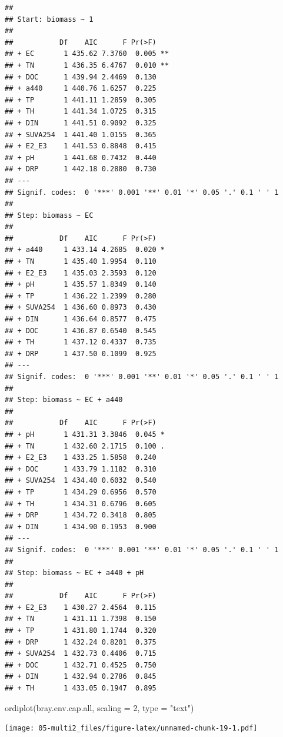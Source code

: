 \documentclass[
]{book}
\newenvironment{Shaded}{\begin{snugshade}}{\end{snugshade}}
\newcommand{\AttributeTok}[1]{\textcolor[rgb]{0.77,0.63,0.00}{#1}}
\newcommand{\DecValTok}[1]{\textcolor[rgb]{0.00,0.00,0.81}{#1}}
\newcommand{\FunctionTok}[1]{\textcolor[rgb]{0.00,0.00,0.00}{#1}}
\newcommand{\NormalTok}[1]{#1}
\newcommand{\StringTok}[1]{\textcolor[rgb]{0.31,0.60,0.02}{#1}}
\begin{document}
\begin{verbatim}
## 
## Start: biomass ~ 1 
## 
##           Df    AIC      F Pr(>F)   
## + EC       1 435.62 7.3760  0.005 **
## + TN       1 436.35 6.4767  0.010 **
## + DOC      1 439.94 2.4469  0.130   
## + a440     1 440.76 1.6257  0.225   
## + TP       1 441.11 1.2859  0.305   
## + TH       1 441.34 1.0725  0.315   
## + DIN      1 441.51 0.9092  0.325   
## + SUVA254  1 441.40 1.0155  0.365   
## + E2_E3    1 441.53 0.8848  0.415   
## + pH       1 441.68 0.7432  0.440   
## + DRP      1 442.18 0.2880  0.730   
## ---
## Signif. codes:  0 '***' 0.001 '**' 0.01 '*' 0.05 '.' 0.1 ' ' 1
## 
## Step: biomass ~ EC 
## 
##           Df    AIC      F Pr(>F)  
## + a440     1 433.14 4.2685  0.020 *
## + TN       1 435.40 1.9954  0.110  
## + E2_E3    1 435.03 2.3593  0.120  
## + pH       1 435.57 1.8349  0.140  
## + TP       1 436.22 1.2399  0.280  
## + SUVA254  1 436.60 0.8973  0.430  
## + DIN      1 436.64 0.8577  0.475  
## + DOC      1 436.87 0.6540  0.545  
## + TH       1 437.12 0.4337  0.735  
## + DRP      1 437.50 0.1099  0.925  
## ---
## Signif. codes:  0 '***' 0.001 '**' 0.01 '*' 0.05 '.' 0.1 ' ' 1
## 
## Step: biomass ~ EC + a440 
## 
##           Df    AIC      F Pr(>F)  
## + pH       1 431.31 3.3846  0.045 *
## + TN       1 432.60 2.1715  0.100 .
## + E2_E3    1 433.25 1.5858  0.240  
## + DOC      1 433.79 1.1182  0.310  
## + SUVA254  1 434.40 0.6032  0.540  
## + TP       1 434.29 0.6956  0.570  
## + TH       1 434.31 0.6796  0.605  
## + DRP      1 434.72 0.3418  0.805  
## + DIN      1 434.90 0.1953  0.900  
## ---
## Signif. codes:  0 '***' 0.001 '**' 0.01 '*' 0.05 '.' 0.1 ' ' 1
## 
## Step: biomass ~ EC + a440 + pH 
## 
##           Df    AIC      F Pr(>F)
## + E2_E3    1 430.27 2.4564  0.115
## + TN       1 431.11 1.7398  0.150
## + TP       1 431.80 1.1744  0.320
## + DRP      1 432.24 0.8201  0.375
## + SUVA254  1 432.73 0.4406  0.715
## + DOC      1 432.71 0.4525  0.750
## + DIN      1 432.94 0.2786  0.845
## + TH       1 433.05 0.1947  0.895
\end{verbatim}

\begin{Shaded}
\begin{Highlighting}[]
\FunctionTok{ordiplot}\NormalTok{(bray.env.cap.all, }\AttributeTok{scaling =} \DecValTok{2}\NormalTok{, }\AttributeTok{type =} \StringTok{"text"}\NormalTok{)}
\end{Highlighting}
\end{Shaded}

\texttt{[image: 05-multi2\_files/figure-latex/unnamed-chunk-19-1.pdf]}
\end{document}
